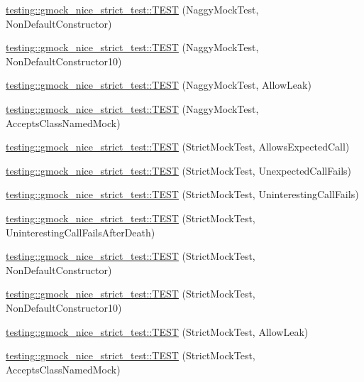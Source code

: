 \begin{DoxyCompactItemize}
\mbox{\hyperlink{namespacetesting_1_1gmock__nice__strict__test_a9618de98b38e8e4270873d9b2616e3e1}{testing\+::gmock\+\_\+nice\+\_\+strict\+\_\+test\+::\+T\+E\+ST}} (Naggy\+Mock\+Test, Non\+Default\+Constructor)
\item 
\mbox{\hyperlink{namespacetesting_1_1gmock__nice__strict__test_a982de09f3040cc5b9f457a7aa4e00652}{testing\+::gmock\+\_\+nice\+\_\+strict\+\_\+test\+::\+T\+E\+ST}} (Naggy\+Mock\+Test, Non\+Default\+Constructor10)
\item 
\mbox{\hyperlink{namespacetesting_1_1gmock__nice__strict__test_abafc38649114354a5dc342524ca2102e}{testing\+::gmock\+\_\+nice\+\_\+strict\+\_\+test\+::\+T\+E\+ST}} (Naggy\+Mock\+Test, Allow\+Leak)
\item 
\mbox{\hyperlink{namespacetesting_1_1gmock__nice__strict__test_af147980581baec3cf492457c2d1e0276}{testing\+::gmock\+\_\+nice\+\_\+strict\+\_\+test\+::\+T\+E\+ST}} (Naggy\+Mock\+Test, Accepts\+Class\+Named\+Mock)
\item 
\mbox{\hyperlink{namespacetesting_1_1gmock__nice__strict__test_a269b7756fb785a84a609543700f77256}{testing\+::gmock\+\_\+nice\+\_\+strict\+\_\+test\+::\+T\+E\+ST}} (Strict\+Mock\+Test, Allows\+Expected\+Call)
\item 
\mbox{\hyperlink{namespacetesting_1_1gmock__nice__strict__test_ae58ab074e0f9218a727d1fec0793667e}{testing\+::gmock\+\_\+nice\+\_\+strict\+\_\+test\+::\+T\+E\+ST}} (Strict\+Mock\+Test, Unexpected\+Call\+Fails)
\item 
\mbox{\hyperlink{namespacetesting_1_1gmock__nice__strict__test_afea105507ce78fc0e2c20d9f4cca16d7}{testing\+::gmock\+\_\+nice\+\_\+strict\+\_\+test\+::\+T\+E\+ST}} (Strict\+Mock\+Test, Uninteresting\+Call\+Fails)
\item 
\mbox{\hyperlink{namespacetesting_1_1gmock__nice__strict__test_a04e9402fd03549e1eda88659b6eac174}{testing\+::gmock\+\_\+nice\+\_\+strict\+\_\+test\+::\+T\+E\+ST}} (Strict\+Mock\+Test, Uninteresting\+Call\+Fails\+After\+Death)
\item 
\mbox{\hyperlink{namespacetesting_1_1gmock__nice__strict__test_a21456158013d707a1238d0ade00ea3f6}{testing\+::gmock\+\_\+nice\+\_\+strict\+\_\+test\+::\+T\+E\+ST}} (Strict\+Mock\+Test, Non\+Default\+Constructor)
\item 
\mbox{\hyperlink{namespacetesting_1_1gmock__nice__strict__test_ae52f11a6045e9c307237cf02b85e6b79}{testing\+::gmock\+\_\+nice\+\_\+strict\+\_\+test\+::\+T\+E\+ST}} (Strict\+Mock\+Test, Non\+Default\+Constructor10)
\item 
\mbox{\hyperlink{namespacetesting_1_1gmock__nice__strict__test_a5f8498b9a90a81c4709b8d3ae968500e}{testing\+::gmock\+\_\+nice\+\_\+strict\+\_\+test\+::\+T\+E\+ST}} (Strict\+Mock\+Test, Allow\+Leak)
\item 
\mbox{\hyperlink{namespacetesting_1_1gmock__nice__strict__test_a4534bdd7c8ca19aad56933d34e0ea4db}{testing\+::gmock\+\_\+nice\+\_\+strict\+\_\+test\+::\+T\+E\+ST}} (Strict\+Mock\+Test, Accepts\+Class\+Named\+Mock)
\end{DoxyCompactItemize}
